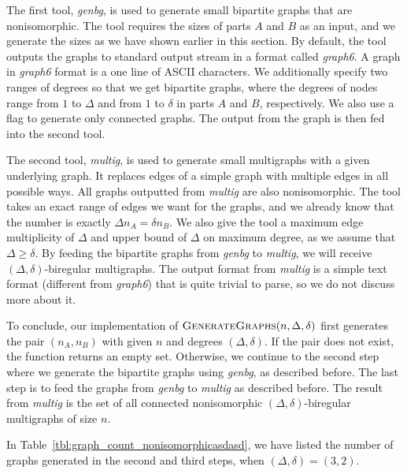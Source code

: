 The first tool, \emph{genbg}, is used to generate small bipartite graphs that are nonisomorphic.
The tool requires the sizes of parts $A$ and $B$ as an input, and we generate the sizes as we have shown earlier in this section.
By default, the tool outputs the graphs to standard output stream in a format called \emph{graph6}.
A graph in \emph{graph6} format is a one line of ASCII characters.
We additionally specify two ranges of degrees so that we get bipartite graphs, where the degrees of nodes range from $1$ to $\Delta$ and from $1$ to $\delta$ in parts $A$ and $B$, respectively.
We also use a flag  to generate only connected graphs.
The output from the graph is then fed into the second tool.

The second tool, \emph{multig}, is used to generate small multigraphs with a given underlying graph.
It replaces edges of a simple graph with multiple edges in all possible ways.
All graphs outputted from \emph{multig} are also nonisomorphic.
The tool takes an exact range of edges we want for the graphs, and we already know that the number is exactly $\Delta n_A = \delta n_B$.
We also give the tool a maximum edge multiplicity of $\Delta$ and upper bound of $\Delta$ on maximum degree, as we assume that $\Delta \geq \delta$.
By feeding the bipartite graphs from \emph{genbg} to \emph{multig}, we will receive $(\Delta, \delta)$-biregular multigraphs.
The output format from \emph{multig} is a simple text format (different from \emph{graph6}) that is quite trivial to parse, so we do not discuss more about it.

To conclude, our implementation of $\textsc{GenerateGraphs}(n, \Delta, \delta)$ first generates the pair $(n_A, n_B)$ with given $n$ and degrees $(\Delta, \delta)$.
If the pair does not exist, the function returns an empty set.
Otherwise, we continue to the second step where we generate the bipartite graphs using \emph{genbg}, as described before.
The last step is to feed the graphs from \emph{genbg} to \emph{multig} as described before.
The result from \emph{multig} is the set of all connected nonisomorphic $(\Delta, \delta)$-biregular multigraphs of size $n$.

In Table~\ref{tbl:graph_count_nonisomorphicasdasd}, we have listed the number of graphs generated in the second and third steps, when $(\Delta, \delta)=(3,2)$.



